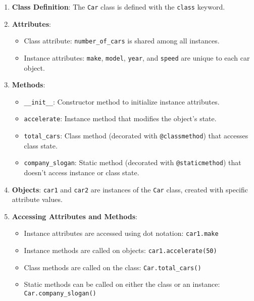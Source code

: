 \begin{enumerate}
\def\labelenumi{\arabic{enumi}.}
\item
  \textbf{Class Definition}: The \texttt{Car} class is defined with the
  \texttt{class} keyword.
\item
  \textbf{Attributes}:

  \begin{itemize}
  \tightlist
  \item
    Class attribute: \texttt{number\_of\_cars} is shared among all
    instances.
  \item
    Instance attributes: \texttt{make}, \texttt{model}, \texttt{year},
    and \texttt{speed} are unique to each car object.
  \end{itemize}
\item
  \textbf{Methods}:

  \begin{itemize}
  \tightlist
  \item
    \texttt{\_\_init\_\_}: Constructor method to initialize instance
    attributes.
  \item
    \texttt{accelerate}: Instance method that modifies the object's
    state.
  \item
    \texttt{total\_cars}: Class method (decorated with
    \texttt{@classmethod}) that accesses class state.
  \item
    \texttt{company\_slogan}: Static method (decorated with
    \texttt{@staticmethod}) that doesn't access instance or class state.
  \end{itemize}
\item
  \textbf{Objects}: \texttt{car1} and \texttt{car2} are instances of the
  \texttt{Car} class, created with specific attribute values.
\item
  \textbf{Accessing Attributes and Methods}:

  \begin{itemize}
  \tightlist
  \item
    Instance attributes are accessed using dot notation:
    \texttt{car1.make}
  \item
    Instance methods are called on objects: \texttt{car1.accelerate(50)}
  \item
    Class methods are called on the class: \texttt{Car.total\_cars()}
  \item
    Static methods can be called on either the class or an instance:
    \texttt{Car.company\_slogan()}
  \end{itemize}
\end{enumerate}

